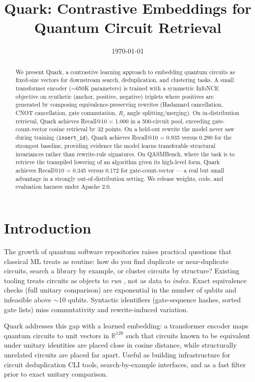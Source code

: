 \documentclass[11pt]{article}
\title{Quark: Contrastive Embeddings for Quantum Circuit Retrieval}
\author{}
\date{\today}
\begin{document}
\maketitle

\begin{abstract}
We present Quark, a contrastive learning approach to embedding quantum circuits as fixed-size vectors for downstream search, deduplication, and clustering tasks. A small transformer encoder ($\sim$650K parameters) is trained with a symmetric InfoNCE objective on synthetic (anchor, positive, negative) triplets where positives are generated by composing equivalence-preserving rewrites (Hadamard cancellation, CNOT cancellation, gate commutation, $R_z$ angle splitting/merging). On in-distribution retrieval, Quark achieves Recall@10 = 1.000 in a 500-circuit pool, exceeding gate-count-vector cosine retrieval by 32 points. On a held-out rewrite the model never saw during training (\texttt{insert\_id}), Quark achieves Recall@10 = 0.935 versus 0.290 for the strongest baseline, providing evidence the model learns transferable structural invariances rather than rewrite-rule signatures. On QASMBench, where the task is to retrieve the transpiled lowering of an algorithm given its high-level form, Quark achieves Recall@10 = 0.345 versus 0.172 for gate-count-vector --- a real but small advantage in a strongly out-of-distribution setting. We release weights, code, and evaluation harness under Apache 2.0.
\end{abstract}

\section{Introduction}

The growth of quantum software repositories raises practical questions that classical ML treats as routine: how do you find duplicate or near-duplicate circuits, search a library by example, or cluster circuits by structure? Existing tooling treats circuits as objects to \emph{run} \cite{qiskit, pennylane}, not as data to \emph{index}. Exact equivalence checks (full unitary comparison) are exponential in the number of qubits and infeasible above $\sim$10 qubits. Syntactic identifiers (gate-sequence hashes, sorted gate lists) miss commutativity and rewrite-induced variation.

Quark addresses this gap with a learned embedding: a transformer encoder maps quantum circuits to unit vectors in $\mathbb{R}^{128}$ such that circuits known to be equivalent under unitary identities are placed close in cosine distance, while structurally unrelated circuits are placed far apart. Useful as building infrastructure for circuit deduplication CLI tools, search-by-example interfaces, and as a fast filter prior to exact unitary comparison.
\end{document}
